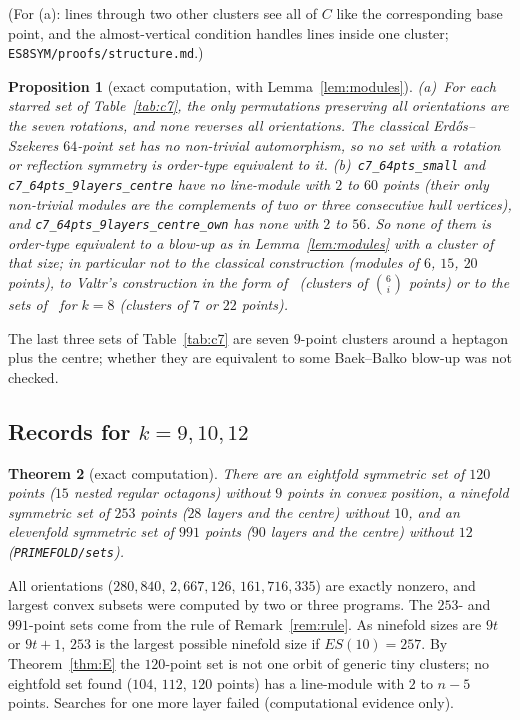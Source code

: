 \documentclass[10pt]{article}
\newtheorem{theorem}{Theorem}[section]
\newtheorem{proposition}[theorem]{Proposition}
\theoremstyle{definition}
\theoremstyle{remark}
\newcommand{\dirn}[1]{{\upshape\nolinkurl{#1}}}
\begin{document}
(For (a): lines through two other clusters see all of $C$ like the corresponding base point, and the almost-vertical
condition handles lines inside one cluster; \dirn{ES8SYM/proofs/structure.md}.)

\begin{proposition}[exact computation, with Lemma~\ref{lem:modules}]\label{prop:noneq}
(a)~For each starred set of Table~\ref{tab:c7}, the only permutations preserving all orientations are the seven
rotations, and none reverses all orientations. The classical Erd\H{o}s--Szekeres $64$-point set has no non-trivial
automorphism, so no set with a rotation or reflection symmetry is order-type equivalent to it.
(b)~\dirn{c7_64pts_small} and \dirn{c7_64pts_9layers_centre} have no line-module with $2$ to $60$ points (their only
non-trivial modules are the complements of two or three consecutive hull vertices), and
\dirn{c7_64pts_9layers_centre_own} has none with $2$ to $56$. So none of them is order-type equivalent to a blow-up as in
Lemma~\ref{lem:modules} with a cluster of that size; in particular not to the classical construction (modules of $6$,
$15$, $20$ points), to Valtr's construction in the form of~\cite[\S6.1]{BB25} (clusters of $\binom6i$ points) or to the
sets of~\cite[Thm.~19]{BB25} for $k=8$ (clusters of $7$ or $22$ points).
\end{proposition}

The last three sets of Table~\ref{tab:c7} are seven $9$-point clusters around a heptagon plus the centre; whether they
are equivalent to some Baek--Balko blow-up was not checked.

\subsection{Records for \texorpdfstring{$k=9,10,12$}{k=9,10,12}}

\begin{theorem}[exact computation]\label{thm:records}
There are an eightfold symmetric set of $120$ points ($15$ nested regular octagons) without $9$ points in convex position,
a ninefold symmetric set of $253$ points ($28$ layers and the centre) without $10$, and an elevenfold symmetric set of
$991$ points ($90$ layers and the centre) without $12$ (\dirn{PRIMEFOLD/sets}).
\end{theorem}

All orientations ($280{,}840$, $2{,}667{,}126$, $161{,}716{,}335$) are exactly nonzero, and largest convex subsets were
computed by two or three programs. The $253$- and $991$-point sets come from the rule of Remark~\ref{rem:rule}. As
ninefold sizes are $9t$ or $9t+1$, $253$ is the largest possible ninefold size if $ES(10)=257$. By Theorem~\ref{thm:E} the
$120$-point set is not one orbit of generic tiny clusters; no eightfold set found ($104$, $112$, $120$ points) has a
line-module with $2$ to $n-5$ points. Searches for one more layer failed (computational evidence only).
\end{document}
